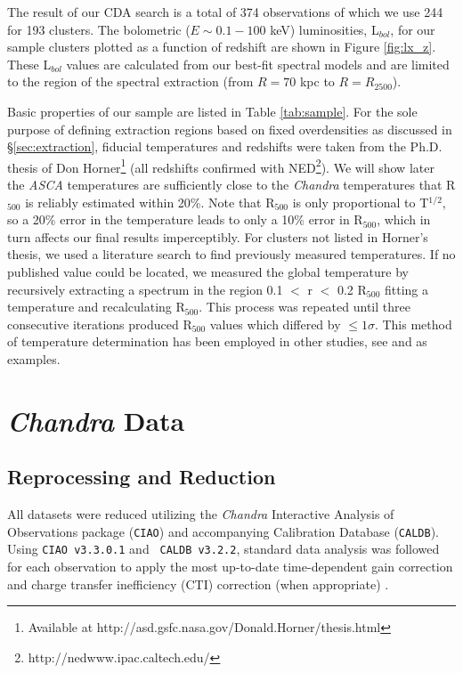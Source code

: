 \documentclass{emulateapj}
\newcommand{\chan}{{\textit{Chandra }}}
\newcommand{\asca}{{\textit{ASCA }}}
\begin{document}
The result of our CDA search is a total of 374 observations of which
we use 244 for 193 clusters. The bolometric ($E \sim 0.1-100$ keV)
luminosities, L$_{bol}$, for our sample clusters plotted as a function of
redshift are shown in Figure \ref{fig:lx_z}. These L$_{bol}$ values
are calculated from our best-fit spectral models and are limited to
the region of the spectral extraction (from $R=70$ kpc to
$R=R_{2500}$).

Basic properties of our sample are listed in Table
\ref{tab:sample}. For the sole purpose of defining extraction regions
based on fixed overdensities as discussed in \S\ref{sec:extraction},
fiducial temperatures and redshifts were taken from the Ph.D. thesis
of Don Horner\footnote{Available at
http://asd.gsfc.nasa.gov/Donald.Horner/thesis.html} (all redshifts
confirmed with NED\footnote{http://nedwww.ipac.caltech.edu/}).
We will show later the \asca temperatures are
sufficiently close to the \chan temperatures that R$_{500}$
is reliably estimated within 20\%. Note that R$_{500}$ is only
proportional to T$^{1/2}$, so a 20\% error in the temperature leads to
only a 10\% error in R$_{500}$, which in turn affects our final
results imperceptibly. For clusters not listed in Horner's thesis, we
used a literature search to find previously measured temperatures. If
no published value could be located, we measured the global temperature by
recursively extracting a spectrum in the region 0.1 $<$ r $<$ 0.2
R$_{500}$ fitting a temperature and recalculating R$_{500}$. This
process was repeated until three consecutive iterations produced
R$_{500}$ values which differed by $\leq 1\sigma$. This method of
temperature determination has been employed in other studies, see
\cite{2006MNRAS.tmp.1068S} and \cite{2006ApJS..162..304H} as
examples.

\section{\chan Data}\label{sec:data}

\subsection{Reprocessing and Reduction}\label{sec:reprocessing}

All datasets were reduced utilizing the \chan Interactive Analysis of
Observations package ({\tt CIAO}) and accompanying Calibration
Database ({\tt CALDB}). Using {\tt CIAO v3.3.0.1} and {\tt
CALDB v3.2.2}, standard data analysis was followed for each
observation to apply the most up-to-date time-dependent gain
correction and charge transfer inefficiency (CTI) correction (when
appropriate) \citep{2000ApJ...534L.139T}.
\end{document}
